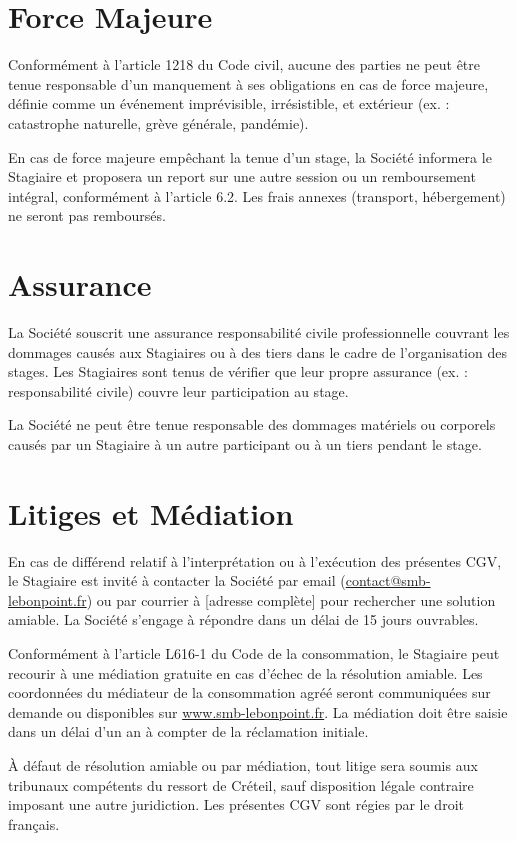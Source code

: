 \documentclass[a4paper,12pt]{article}
\begin{document}
\section{Force Majeure}
Conformément à l'article 1218 du Code civil, aucune des parties ne peut être tenue responsable d'un manquement à ses obligations en cas de force majeure, définie comme un événement imprévisible, irrésistible, et extérieur (ex. : catastrophe naturelle, grève générale, pandémie). 

En cas de force majeure empêchant la tenue d'un stage, la Société informera le Stagiaire et proposera un report sur une autre session ou un remboursement intégral, conformément à l'article 6.2. Les frais annexes (transport, hébergement) ne seront pas remboursés.

\section{Assurance}
La Société souscrit une assurance responsabilité civile professionnelle couvrant les dommages causés aux Stagiaires ou à des tiers dans le cadre de l'organisation des stages. Les Stagiaires sont tenus de vérifier que leur propre assurance (ex. : responsabilité civile) couvre leur participation au stage. 

La Société ne peut être tenue responsable des dommages matériels ou corporels causés par un Stagiaire à un autre participant ou à un tiers pendant le stage.

\section{Litiges et Médiation}
En cas de différend relatif à l'interprétation ou à l'exécution des présentes CGV, le Stagiaire est invité à contacter la Société par email (\href{mailto:contact@smb-lebonpoint.fr}{contact@smb-lebonpoint.fr}) ou par courrier à [adresse complète] pour rechercher une solution amiable. La Société s'engage à répondre dans un délai de 15 jours ouvrables.

Conformément à l'article L616-1 du Code de la consommation, le Stagiaire peut recourir à une médiation gratuite en cas d'échec de la résolution amiable. Les coordonnées du médiateur de la consommation agréé seront communiquées sur demande ou disponibles sur \href{https://www.smb-lebonpoint.fr}{www.smb-lebonpoint.fr}. La médiation doit être saisie dans un délai d'un an à compter de la réclamation initiale.

À défaut de résolution amiable ou par médiation, tout litige sera soumis aux tribunaux compétents du ressort de Créteil, sauf disposition légale contraire imposant une autre juridiction. Les présentes CGV sont régies par le droit français.
\end{document}

